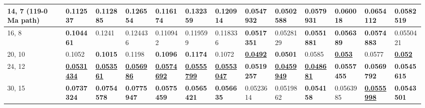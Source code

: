 \begin{table*}
{\begin{tabular}{|l|l|l|l|l|l|l|l|l|l|l|l|l|}
14, 7 (119-0 Ma path) & 0.112537 & 0.112885 & 0.126554 & 0.116174 &
  0.132359 & 0.120914 & 0.0547932 & {\color[HTML]{34FF34} \textbf{0.0502588}} & 0.0579931 & 0.060018 & 0.0654112 & 0.0582519 \\ \hline
16, 8 & {\color[HTML]{34FF34} \textbf{0.104461}} & 0.1241 & 0.124436 & 0.110942 & 0.119599 & 0.118336 & {\color[HTML]{32CB00} \textbf{0.0517351}} & 0.0528129 & {\color[HTML]{34FF34} \textbf{0.0551881}} & {\color[HTML]{34FF34} \textbf{0.056389}} & {\color[HTML]{34FF34} \textbf{0.0574883}} & 0.0550421 \\ \hline
20, 10 & 0.1052 & {\color[HTML]{34FF34} \textbf{0.1015}} & 0.1198 & {\color[HTML]{34FF34} \textbf{0.1096}} & {\color[HTML]{34FF34} \textbf{0.1174}} & 0.1072 & {\color[HTML]{009901} {\ul \textbf{0.0492}}} & {\color[HTML]{32CB00} \textbf{0.0501}}
  & 0.0585 & {\color[HTML]{009901} {\ul \textbf{0.053}}} & 0.0577 & {\color[HTML]{009901} {\ul \textbf{0.052}}} \\ \hline
24, 12 & {\color[HTML]{009901} {\ul \textbf{0.0531434}}} & {\color[HTML]{009901} {\ul \textbf{0.053561}}} & {\color[HTML]{009901} {\ul \textbf{0.056986}}} & {\color[HTML]{009901} {\ul \textbf{0.0574692}}} & {\color[HTML]{009901} {\ul \textbf{0.0555799}}} & {\color[HTML]{009901} {\ul \textbf{0.0553047}}} & {\color[HTML]{34FF34} \textbf{0.0519257}} & {\color[HTML]{009901} {\ul
  \textbf{0.0459949}}} & {\color[HTML]{009901} {\ul \textbf{0.048681}}} & {\color[HTML]{32CB00} \textbf{0.0557455}} & {\color[HTML]{32CB00} \textbf{0.0569792}} & {\color[HTML]{34FF34} \textbf{0.0545615}} \\ \hline
30, 15 & {\color[HTML]{32CB00} \textbf{0.0737324}} & {\color[HTML]{32CB00} \textbf{0.0754578}} & {\color[HTML]{32CB00} \textbf{0.0775947}} & {\color[HTML]{32CB00} \textbf{0.0575459}} & {\color[HTML]{32CB00} \textbf{0.0565421}} & {\color[HTML]{32CB00} \textbf{0.056635}} & 0.0523614 & 0.0519862 & {\color[HTML]{32CB00} \textbf{0.054158}} & 0.0563985 & {\color[HTML]{009901} {\ul \textbf{0.0555998}}} & {\color[HTML]{32CB00} \textbf{0.0543501}} \\ \hline
\end{tabular}%
}
\end{table*}
